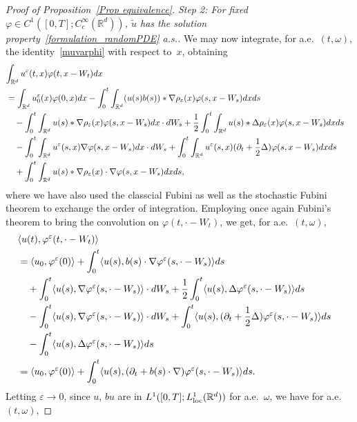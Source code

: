 \documentclass[a4paper,10pt]{article}
\newcommand\1{\mathbbm{1}}
\newcommand{\lan}{\langle}
\newcommand{\ran}{\rangle}
\newcommand{\td}{\tilde}
\newcommand{\eps}{\varepsilon}
\newcommand\loc{{\rm loc}}
\numberwithin{equation}{section}
\begin{document}
\begin{proof}[Proof of Proposition~\ref{Prop equivalence}]
\emph{Step 2: For fixed $\varphi \in C^1([0,T];C^\infty_c(\mathbb{R}^d))$, $\td{u}$ has the solution property~\eqref{formulation_randomPDE} a.s..} We may now integrate, for a.e.~$(t,\omega)$, the identity~\eqref{muvarphi} with respect to~$x$, obtaining 
\begin{align}
\label{eqn_u_eps_tested_3}
\lefteqn{\int_{\mathbb{R}^d} u^\eps(t,x)\varphi(t,x-W_t) dx} \\
 & = \int_{\mathbb{R}^d} u_0^\eps(x)\varphi(0,x) d x -\int^t_0\int_{\mathbb{R}^d}( u(s)b(s))*\nabla\rho_\eps(x)\varphi(s,x-W_s) dx ds \nonumber\\
 & \quad -\int^t_0\int_{\mathbb{R}^d} u(s)*\nabla\rho_\eps(x)\varphi(s,x-W_s) d x\cdot d W_s +\frac12\int^t_0\int_{\mathbb{R}^d} u(s)*\Delta\rho_\eps(x)\varphi(s,x-W_s) dx ds \nonumber\\
 & \quad -\int^t_0\int_{\mathbb{R}^d} u^\eps(s,x)\nabla\varphi(s,x-W_s) d x\cdot d W_s +\int^t_0\int_{\mathbb{R}^d} u^\eps(s,x)(\partial_t+\frac12\Delta)\varphi(s,x-W_s) d x d s \nonumber\\
 & \quad +\int^t_0\int_{\mathbb{R}^d} u(s)*\nabla\rho_\eps(x)\cdot\nabla\varphi(s,x-W_s) dx ds,\nonumber
\end{align}
where we have also used the classcial Fubini as well as the stochastic Fubini theorem to exchange the order of integration. Employing once again Fubini's theorem to bring the convolution on $\varphi(t,\cdot-W_t)$, we get, for a.e.~$(t,\omega)$,
\begin{align}
\lefteqn{\lan u(t),\varphi^\eps(t,\cdot-W_t)\ran} \nonumber\\
 &= \lan u_0,\varphi^\eps(0)\ran + \int^t_0\lan u(s),b(s)\cdot\nabla\varphi^\eps(s,\cdot-W_s)\ran ds \nonumber\\
 & \quad +\int^t_0\lan u(s),\nabla\varphi^\eps(s,\cdot-W_s)\ran\cdot d W_s +\frac12\int^t_0\lan u(s),\Delta\varphi^\eps(s,\cdot-W_s)\ran ds \nonumber\\
 & \quad -\int^t_0\lan u(s),\nabla\varphi^\eps(s,\cdot-W_s)\ran\cdot d W_s + \int^t_0\lan u(s),(\partial_t+\frac12\Delta)\varphi^\eps(s,\cdot-W_s)\ran ds \nonumber\\
 & \quad -\int^t_0\lan u(s),\Delta\varphi^\eps(s,\cdot-W_s)\ran ds  \nonumber\\
 & = \lan u_0,\varphi^\eps(0) \ran + \int^t_0\lan u(s),(\partial_t+b(s)\cdot\nabla)\varphi^\eps(s,\cdot-W_s)\ran d s.\nonumber
\end{align}
Letting $\eps\rightarrow0$, since $ u$, $b u$ are in $L^1([0,T];L^1_\loc(\mathbb{R}^d))$ for a.e.~$\omega$, we have for a.e.~$(t,\omega)$,

\end{proof}
\end{document}
